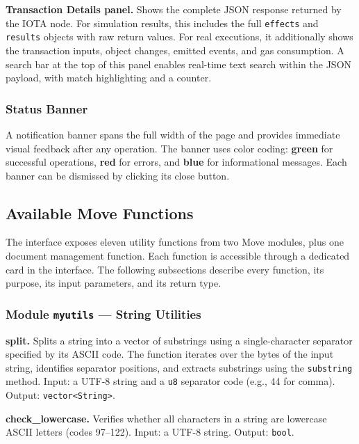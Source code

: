 \documentclass[12pt,a4paper]{article}
\begin{document}
\textbf{Transaction Details panel.} Shows the complete JSON response returned by the IOTA node. For simulation results, this includes the full \texttt{effects} and \texttt{results} objects with raw return values. For real executions, it additionally shows the transaction inputs, object changes, emitted events, and gas consumption. A search bar at the top of this panel enables real-time text search within the JSON payload, with match highlighting and a counter.

\subsubsection{Status Banner}

A notification banner spans the full width of the page and provides immediate visual feedback after any operation. The banner uses color coding: \textbf{green} for successful operations, \textbf{red} for errors, and \textbf{blue} for informational messages. Each banner can be dismissed by clicking its close button.

\subsection{Available Move Functions}

The interface exposes eleven utility functions from two Move modules, plus one document management function. Each function is accessible through a dedicated card in the interface. The following subsections describe every function, its purpose, its input parameters, and its return type.

\subsubsection{Module \texttt{myutils} --- String Utilities}

\textbf{split.} Splits a string into a vector of substrings using a single-character separator specified by its ASCII code. The function iterates over the bytes of the input string, identifies separator positions, and extracts substrings using the \texttt{substring} method. Input: a UTF-8 string and a \texttt{u8} separator code (e.g., 44 for comma). Output: \texttt{vector<String>}.

\textbf{check\_lowercase.} Verifies whether all characters in a string are lowercase ASCII letters (codes 97--122). Input: a UTF-8 string. Output: \texttt{bool}.
\end{document}

